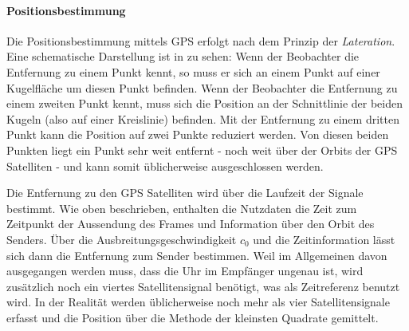 
\paragraph{Positionsbestimmung}
\label{positionsbestimmung}

Die Positionsbestimmung mittels GPS erfolgt nach dem Prinzip der \emph{Lateration}. Eine schematische Darstellung ist in  zu sehen: Wenn der Beobachter die Entfernung zu einem Punkt kennt, so muss er sich an einem Punkt auf einer Kugelfläche um diesen Punkt befinden. Wenn der Beobachter die Entfernung zu einem zweiten Punkt kennt, muss sich die Position an der Schnittlinie der beiden Kugeln (also auf einer Kreislinie) befinden. Mit der Entfernung zu einem dritten Punkt kann die Position auf zwei Punkte reduziert werden. Von diesen beiden Punkten liegt ein Punkt sehr weit entfernt - noch weit über der Orbits der GPS Satelliten - und kann somit üblicherweise ausgeschlossen werden. 

Die Entfernung zu den GPS Satelliten wird über die Laufzeit der Signale bestimmt. Wie oben beschrieben, enthalten die Nutzdaten die Zeit zum Zeitpunkt der Aussendung des Frames und Information über den Orbit des Senders. Über die Ausbreitungsgeschwindigkeit $c_0$ und die Zeitinformation lässt sich dann die Entfernung zum Sender bestimmen. Weil im Allgemeinen davon ausgegangen werden muss, dass die Uhr im Empfänger ungenau ist, wird zusätzlich noch ein viertes Satellitensignal benötigt, was als Zeitreferenz benutzt wird. In der Realität werden üblicherweise noch mehr als vier Satellitensignale erfasst und die Position über die Methode der kleinsten Quadrate gemittelt.

